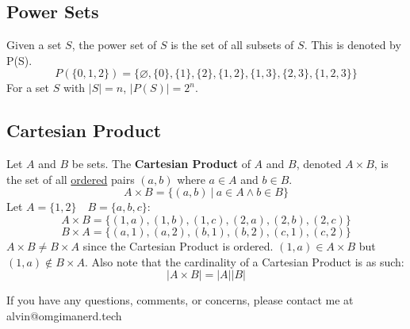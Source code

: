 \documentclass[letterpaper, 12pt]{math}
\begin{document}
\subsection*{Power Sets}
Given a set \( S \), the power set of \( S \) is the set of all subsets of
\( S \). This is denoted by P(S).
\[ P(\{0,1,2\}) = \{ \varnothing, \{0\}, \{1\}, \{2\}, \{1,2\}, \{1,3\}, \{2,3\},
   \{1,2,3\}\} \]
For a set \( S \) with \( |S| = n \), \( |P(S)| = 2^{n} \).

\subsection*{Cartesian Product}
Let \( A \) and \( B \) be sets. The \textbf{Cartesian Product} of \( A \) and
\( B \), denoted \( A \times B \), is the set of all \underline{ordered} pairs
\( (a, b) \) where \( a \in A \) and \( b \in B \).
\[ A \times B = \{(a,b)\ |\ a \in A \wedge b \in B\} \]
Let \( A = \{1,2\} \quad B = \{a,b,c\} \):
\[ A \times B = \{(1,a),(1,b),(1,c),(2,a),(2,b),(2,c)\} \]
\[ B \times A = \{(a,1),(a,2),(b,1),(b,2),(c,1),(c,2)\} \]
\( A \times B \neq B \times A \) since the Cartesian Product is ordered.
\( (1,a) \in A \times B \) but \( (1,a) \notin B \times A \).
Also note that the cardinality of a Cartesian Product is as such:
\[ |A \times B| = |A||B| \]

\begin{center}
  If you have any questions, comments, or concerns, please contact me at
  alvin@omgimanerd.tech
\end{center}
\end{document}
